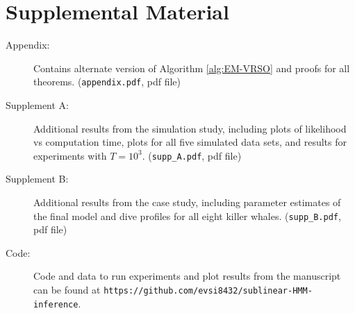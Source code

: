 \documentclass[11pt]{article}
\begin{document}
\section*{Supplemental Material}
\begin{description}
    \item[Appendix:] Contains alternate version of Algorithm \ref{alg:EM-VRSO} and proofs for all theorems. (\texttt{appendix.pdf}, pdf file) 
    \item[Supplement A:] Additional results from the simulation study, including plots of likelihood vs computation time, plots for all five simulated data sets, and results for experiments with $T=10^3$. (\texttt{supp\_A.pdf}, pdf file)
    \item[Supplement B:] Additional results from the case study, including parameter estimates of the final model and dive profiles for all eight killer whales. (\texttt{supp\_B.pdf}, pdf file)
    \item[Code:] Code and data to run experiments and plot results from the manuscript can be found at \texttt{https://github.com/evsi8432/sublinear-HMM-inference}.
\end{description} 


\end{document}
